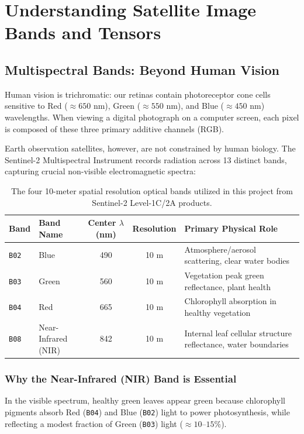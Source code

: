 \chapter{Understanding Satellite Image Bands and Tensors}
\label{chap:ch02}

\section{Multispectral Bands: Beyond Human Vision}
Human vision is trichromatic: our retinas contain photoreceptor cone cells sensitive to Red ($\approx 650\text{ nm}$), Green ($\approx 550\text{ nm}$), and Blue ($\approx 450\text{ nm}$) wavelengths. When viewing a digital photograph on a computer screen, each pixel is composed of these three primary additive channels (RGB).

Earth observation satellites, however, are not constrained by human biology. The Sentinel-2 Multispectral Instrument records radiation across 13 distinct bands, capturing crucial non-visible electromagnetic spectra:

\begin{table}[htbp]
\centering
\small
\begin{tabularx}{\textwidth}{llccX}
\toprule
\textbf{Band} & \textbf{Band Name} & \textbf{Center $\lambda$ (nm)} & \textbf{Resolution} & \textbf{Primary Physical Role} \\
\midrule
\texttt{B02} & Blue & 490 & 10 m & Atmosphere/aerosol scattering, clear water bodies \\
\texttt{B03} & Green & 560 & 10 m & Vegetation peak green reflectance, plant health \\
\texttt{B04} & Red & 665 & 10 m & Chlorophyll absorption in healthy vegetation \\
\texttt{B08} & Near-Infrared (NIR) & 842 & 10 m & Internal leaf cellular structure reflectance, water boundaries \\
\bottomrule
\end{tabularx}
\caption{The four 10-meter spatial resolution optical bands utilized in this project from Sentinel-2 Level-1C/2A products.}
\label{tab:s2_bands}
\end{table}

\subsection{Why the Near-Infrared (NIR) Band is Essential}
In the visible spectrum, healthy green leaves appear green because chlorophyll pigments absorb Red (\texttt{B04}) and Blue (\texttt{B02}) light to power photosynthesis, while reflecting a modest fraction of Green (\texttt{B03}) light ($\approx 10\text{--}15\%$).

